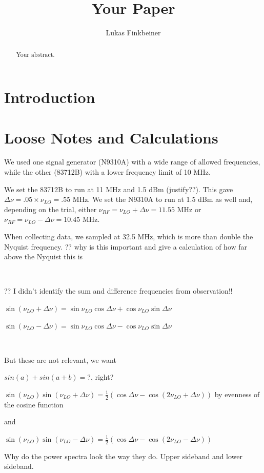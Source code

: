 \documentclass[a4paper]{article}
\title{Your Paper}
\author{Lukas Finkbeiner}
\begin{document}
\maketitle

\begin{abstract}
Your abstract.
\end{abstract}

\section{Introduction}

\section{Loose Notes and Calculations}

We used one signal generator (N9310A) with a wide range of allowed frequencies, while the other (83712B) with a lower frequency limit of 10 MHz. 

We set the 83712B to run at 11 MHz and 1.5 dBm (justify??). This gave $\Delta \nu = .05 \times \nu_{LO} = .55$ MHz. We set the N9310A to run at 1.5 dBm as well and, depending on the trial, either $\nu_{RF} = \nu_{LO} + \Delta \nu = 11.55$ MHz or $\nu_{RF} = \nu_{LO} - \Delta \nu = 10.45$ MHz. 

When collecting data, we sampled at 32.5 MHz, which is more than double the Nyquist frequency. ?? why is this important and give a calculation of how far above the Nyquist this is

\

?? I didn't identify the sum and difference frequencies from observation!!

$\sin(\nu_{LO} + \Delta \nu) = \sin \nu_{LO} \cos \Delta \nu + \cos \nu_{LO} \sin \Delta \nu$

$\sin(\nu_{LO} - \Delta \nu) = \sin \nu_{LO} \cos \Delta \nu - \cos \nu_{LO} \sin \Delta \nu$

\

But these are not relevant, we want

$sin(a) + sin(a + b) = ?$, right?

$\sin(\nu_{LO}) \sin(\nu_{LO} + \Delta \nu) = \frac{1}{2} (\cos \Delta \nu - \cos (2\nu_{LO} + \Delta \nu))$ by evenness of the cosine function

and

$\sin(\nu_{LO}) \sin(\nu_{LO} - \Delta \nu) = \frac{1}{2} (\cos \Delta \nu - \cos (2\nu_{LO} - \Delta \nu))$

Why do the power spectra look the way they do. Upper sideband and lower sideband.
\end{document}
